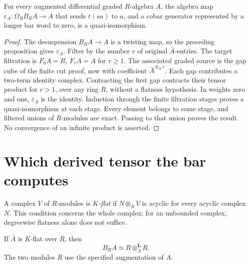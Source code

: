 \begin{proposition}\label{v4-prop:bar-cobar-resolution}
For every augmented differential graded \(R\)-algebra \(A\),
the algebra map
\(\varepsilon_A:\Omega_RB_RA\to A\) that sends \(t(sa)\) to
\(a\), and a cobar generator represented by a longer bar word
to zero, is a quasi-isomorphism.
\end{proposition}

\begin{proof}
The desuspension \(B_RA\to A\) is a twisting map, so the preceding
proposition gives \(\varepsilon_A\). Filter by the number \(r\)
of original \(\bar A\)-entries. The target filtration is
\(F_0A=R\), \(F_rA=A\) for \(r\geq1\). The associated graded
source is the gap cube of the finite cut proof, now with
coefficient \(\bar A^{\otimes_R r}\). Each gap contributes a
two-term identity complex. Contracting the first gap contracts
their tensor product for \(r>1\), over any ring \(R\), without
a flatness hypothesis. In weights zero and one,
\(\varepsilon_A\) is the identity. Induction through the finite
filtration stages proves a quasi-isomorphism at each stage.
Every element belongs to some stage, and filtered unions of
\(R\)-modules are exact. Passing to that union proves the result.
No convergence of an infinite product is asserted.
\end{proof}

\section{Which derived tensor the bar computes}
\label{v4-sec:bar-derived-tensor}

A complex \(V\) of \(R\)-modules is \emph{\(K\)-flat} if
\(N\otimes_R V\) is acyclic for every acyclic complex \(N\).
This condition concerns the whole complex; for an unbounded
complex, degreewise flatness alone does not suffice.

\begin{proposition}\label{v4-prop:bar-derived-tensor}
If \(\bar A\) is \(K\)-flat over \(R\), then
\[
 B_RA\simeq R\otimes_A^{\mathbf L}R.
\]
The two modules \(R\) use the specified augmentation of \(A\).
\end{proposition}

